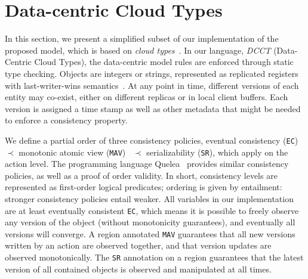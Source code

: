 \documentclass[numbers]{sigplanconf}
\begin{document}
%


\section{Data-centric Cloud Types}
\label{sec:example}
In this section, we present a simplified subset of our implementation of the
proposed model, which is based on \emph{cloud
types}~\cite{burckhardt2012cloud}. In our language, \emph{DCCT} (Data-Centric
Cloud Types), the data-centric model rules are enforced through static type 
checking. Objects are integers or strings,
represented as replicated registers with last-writer-wins
semantics~\cite{burckhardt2014replicated}. At any point in time, different
versions of each entity may co-exist, either on different replicas or in local 
client buffers. Each version is assigned a time stamp as well as other metadata 
that might be needed to enforce a consistency property.

We define a partial order of three consistency policies, eventual
consistency (\texttt{EC}) $\prec$ monotonic atomic view (\texttt{MAV})~\cite{bailis2013highly}  $\prec$
serializability (\texttt{SR}), which apply on the action level. The programming language 
Quelea~\cite{sivaramakrishnan2015declarative} provides similar
consistency policies, as well as a proof of order validity. In short, consistency
levels are represented as first-order logical predicates; ordering is given
by entailment: stronger consistency policies entail weaker.
All variables in our implementation are at least eventually consistent
\texttt{EC}, which means it
is possible to freely observe any version of the object (without monotonicity
guarantees), and eventually all versions will converge. A region annotated 
\texttt{MAV} guarantees that all new versions written by an
action are observed together, and that version updates are observed
monotonically. The \texttt{SR} annotation on a
region guarantees that the latest version of all
contained objects is observed and manipulated at all times. 
\end{document}
